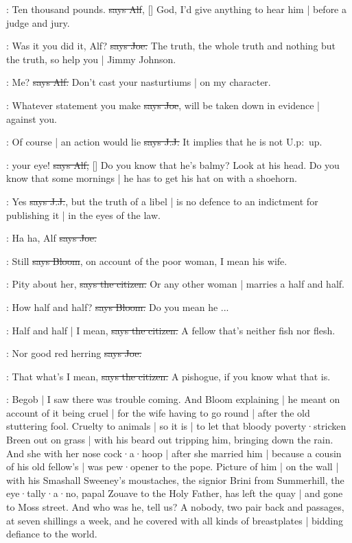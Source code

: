 \bergan:
Ten thousand pounds.
\sout{says Alf},
[]
God,
I'd give anything to hear him |
before a judge and jury.

\joe:
Was it you did it,
Alf?
\sout{says Joe.}
The truth,
the whole truth and nothing but the truth,
so help you |
Jimmy Johnson.

\bergan:
Me?
\sout{says Alf.}
Don't cast your nasturtiums |
on my character.

\joe:
Whatever statement you make
\sout{says Joe},
will be taken down in evidence |
against you.

\jjom:
Of course |
an action would lie
\sout{says J.J.}
It implies that he is not 
U.p:~up.

\bergan:
 your eye!
\sout{says Alf,}
[]
Do you know that he's balmy?
Look at his head.
Do you know that some mornings |
he has to get his hat on with a shoehorn.

\jjom:
Yes
\sout{says J.J.},
but the truth of a libel |
is no defence to an indictment for publishing it |
in the eyes of the law.

\joe:
Ha ha,
Alf
\sout{says Joe.}

\Bloom:
Still
\sout{says Bloom},
on account of the poor woman,
I mean his wife.

\citizen:
Pity about her,
\sout{says the citizen.}
Or any other woman |
marries a half and half.

\Bloom:
How half and half?
\sout{says Bloom.}
Do you mean he ...

\citizen:
Half and half |
I mean,
\sout{says the citizen.}
A fellow that's neither fish nor flesh.

\joe:
Nor good red herring
\sout{says Joe.}

\citizen:
That what's I mean,
\sout{says the citizen.}
A pishogue,
if you know what that is.

\Nq:
Begob |
I saw there was trouble coming.
And Bloom explaining |
he meant on account of it being cruel |
for the wife having to go round |
after the old stuttering fool.
Cruelty to animals |
so it is |
to let that bloody poverty·stricken Breen out on grass |
with his beard out tripping him,
bringing down the rain.
And she with her nose cock·a·hoop |
after she married him |
because a cousin of his old fellow's |
was pew·opener to the pope.
Picture of him |
on the wall |
with his Smashall Sweeney's moustaches,
the signior Brini from Summerhill,
the eye·tally·a·no,
papal Zouave to the Holy Father,
has left the quay |
and gone to Moss street.
And who was he,
tell us?
A nobody,
two pair back and passages,
at seven shillings a week,
and he covered with all kinds of breastplates
 |
bidding defiance to the world.

